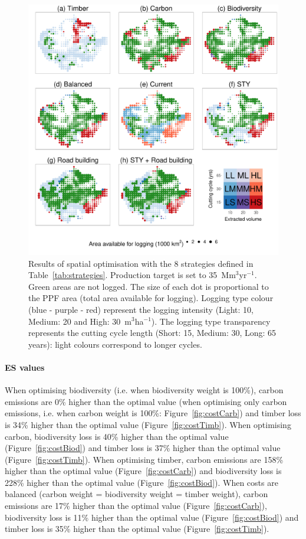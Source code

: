 \documentclass{article}
\begin{document}
\begin{figure}
    \centering
    \includegraphics[width=0.8\linewidth]{graphs/mapsScenarios.pdf}
    \caption{Results of spatial optimisation with the 8 strategies defined in Table~\ref{tab:strategies}. Production target is set to 35~Mm$^3$yr$^{-1}$. Green areas are not logged. The size of each dot is proportional to the PPF area (total area available for logging). Logging type colour (blue - purple - red) represent the logging intensity (Light: 10, Medium: 20 and High: 30~m$^3$ha$^{-1}$). The logging type transparency represents the cutting cycle length (Short: 15, Medium: 30, Long: 65 years): light colours correspond to longer cycles.}
    \label{fig:uniqueCost}
    
\end{figure}


\paragraph{ES values}

When optimising biodiversity (i.e. when biodiversity weight is 100\%), carbon emissions are 0\% higher than the optimal value (when optimising only carbon emissions, i.e. when carbon weight is 100\%: Figure~\ref{fig:costCarb}) and timber loss is 34\% higher than the optimal value (Figure~\ref{fig:costTimb}). When optimising carbon, biodiversity loss is 40\% higher than the optimal value (Figure~\ref{fig:costBiod}) and timber loss is 37\% higher than the optimal value (Figure~\ref{fig:costTimb}). When optimising timber, carbon emissions are 158\% higher than the optimal value (Figure~\ref{fig:costCarb}) and biodiversity loss is 228\% higher than the optimal value (Figure~\ref{fig:costBiod}).  When costs are balanced (carbon weight = biodiversity weight = timber weight), carbon emissions are 17\% higher than the optimal value (Figure~\ref{fig:costCarb}), biodiversity loss is 11\% higher than the optimal value (Figure~\ref{fig:costBiod}) and timber loss is 35\% higher than the optimal value (Figure~\ref{fig:costTimb}). 
\end{document}
